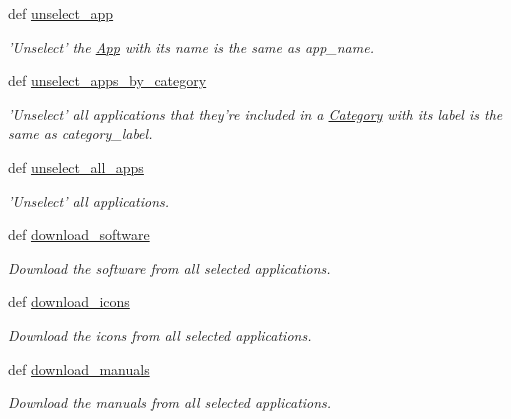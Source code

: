 \begin{CompactItemize}
def \hyperlink{classwinsollib_1_1Image_7039df04ad747bf0a5ab24a7cd7c4d2e}{unselect\_\-app}
\begin{CompactList}\small\item\em 'Unselect' the \hyperlink{classwinsollib_1_1App}{App} with its name is the same as {\em app\_\-name\/}. \item\end{CompactList}\item 
def \hyperlink{classwinsollib_1_1Image_a355ad7d6f40795aa7b6d276f2f07e85}{unselect\_\-apps\_\-by\_\-category}
\begin{CompactList}\small\item\em 'Unselect' all applications that they're included in a \hyperlink{classwinsollib_1_1Category}{Category} with its label is the same as {\em category\_\-label\/}. \item\end{CompactList}\item 
def \hyperlink{classwinsollib_1_1Image_07601dc9093b73baf5cef5746e7a6deb}{unselect\_\-all\_\-apps}
\begin{CompactList}\small\item\em 'Unselect' all applications. \item\end{CompactList}\item 
def \hyperlink{classwinsollib_1_1Image_fb6629034f715f62610e22accda9a21e}{download\_\-software}
\begin{CompactList}\small\item\em Download the software from all selected applications. \item\end{CompactList}\item 
def \hyperlink{classwinsollib_1_1Image_611073a78a6eb928cf5211ce15b058e9}{download\_\-icons}
\begin{CompactList}\small\item\em Download the icons from all selected applications. \item\end{CompactList}\item 
def \hyperlink{classwinsollib_1_1Image_02f8176cede60d9e12978645a676a280}{download\_\-manuals}
\begin{CompactList}\small\item\em Download the manuals from all selected applications. \item\end{CompactList}\item 

\end{CompactItemize}
